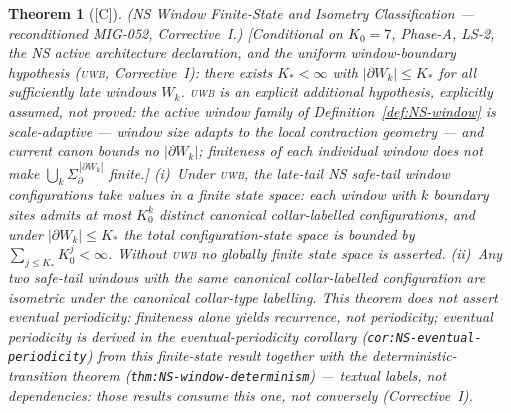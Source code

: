 \documentclass[12pt,oneside]{amsbook}
\theoremstyle{plain}
\newtheorem{theorem}{Theorem}[section]
\theoremstyle{definition}
\theoremstyle{remark}
\newcommand{\status}[1]{\textup{[#1]}}
\begin{document}
\begin{theorem}[\status{C}]\label{thm:NS-window-uniformity}
\textup{(NS Window Finite-State and Isometry Classification ---
reconditioned MIG-052, Corrective~I.)}
\textup{[Conditional on $K_0=7$, Phase-A, LS-2, the NS active
architecture declaration, \emph{and the uniform window-boundary
hypothesis} (\textsc{uwb}, Corrective~I): there exists
$K_* < \infty$ with $|\partial W_k| \leq K_*$ for all
sufficiently late windows $W_k$. \textsc{uwb} is an explicit
additional hypothesis, \emph{explicitly assumed, not proved}: the
active window family of Definition~\ref{def:NS-window} is
scale-adaptive --- window size adapts to the local contraction
geometry --- and current canon bounds no $|\partial W_k|$;
finiteness of each individual window does not make
$\bigcup_k \Sigma_\partial^{\,|\partial W_k|}$ finite.]}
(i)~Under \textsc{uwb}, the late-tail NS safe-tail window
configurations take values in a finite state space: each window
with $k$ boundary sites admits at most $K_0^{k}$ distinct canonical
collar-labelled configurations, and under
$|\partial W_k| \leq K_*$ the total configuration-state space is
bounded by $\sum_{j \leq K_*} K_0^{j} < \infty$. \emph{Without
\textsc{uwb} no globally finite state space is asserted.}
(ii)~Any two safe-tail windows with the same canonical
collar-labelled configuration are isometric under the canonical
collar-type labelling. \emph{This theorem does not assert eventual
periodicity}: finiteness alone yields recurrence, not periodicity;
eventual periodicity is derived in the eventual-periodicity
corollary (\texttt{cor:NS-eventual-periodicity}) from this
finite-state result together with the deterministic-transition
theorem (\texttt{thm:NS-window-determinism}) --- textual labels,
not dependencies: those results consume this one, not conversely
(Corrective~I).
\end{theorem}
\end{document}
